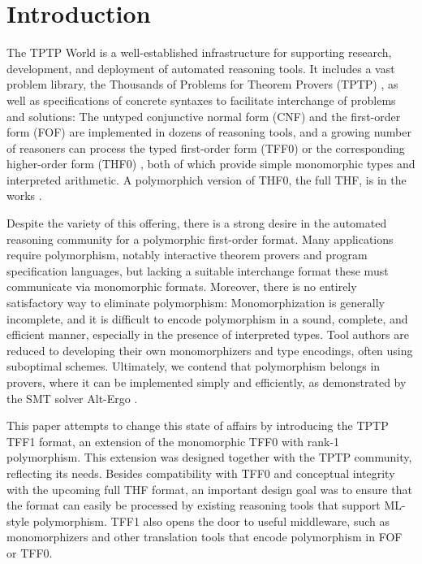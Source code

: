 \section{Introduction}
\label{sec_intro}

The TPTP World \cite{sutcliffe-2010-world} is a well-established infrastructure
for supporting research, development, and deployment of automated reasoning
tools. It includes a vast problem library, the Thousands of Problems for Theorem
Provers (TPTP) \cite{sutcliffe-2009-lib}, as well as specifications of concrete
syntaxes to facilitate interchange of problems and solutions: The untyped
conjunctive normal form (CNF) and the first-order form (FOF) are implemented in
dozens of reasoning tools, and a growing number of reasoners can process the
typed first-order form (TFF0) \cite{sutcliffe-et-al-2011-tff0} or the
corresponding higher-order form (THF0) \cite{benzmueller-et-al-2008-thf0}, both
of which provide simple monomorphic types and interpreted arithmetic. A
polymorphich version of THF0, the full THF, is in the works
\cite{sutcliffe-benzmueller-2010}.

Despite the variety of this offering, there is a strong desire in the automated
reasoning community for a polymorphic first-order format. Many applications
require polymorphism, notably interactive theorem provers and program
specification languages, but lacking a suitable interchange format these
must communicate via monomorphic formats. Moreover, there is no entirely
satisfactory way to eliminate polymorphism: Monomorphization is generally
incomplete, and it is difficult to encode polymorphism in a sound, complete, and
efficient manner, especially in the presence of interpreted types. Tool authors
are reduced to developing their own monomorphizers and type encodings, often
using suboptimal schemes. Ultimately, we contend that polymorphism belongs in
provers, where it can be implemented simply and efficiently, as demonstrated by
the SMT solver Alt-Ergo \cite{bobot-et-al-2008}.

This paper attempts to change this state of affairs by introducing the TPTP TFF1
format, an extension of the monomorphic TFF0 with rank-1 polymorphism. This
extension was designed together with the TPTP community, reflecting its needs.
Besides compatibility with TFF0 and conceptual integrity with the upcoming full
THF format, an important design goal was to ensure that the format can easily be
processed by existing reasoning tools that support ML-style polymorphism. TFF1
also opens the door to useful middleware, such as monomorphizers and other
translation tools that encode polymorphism in FOF or TFF0.

